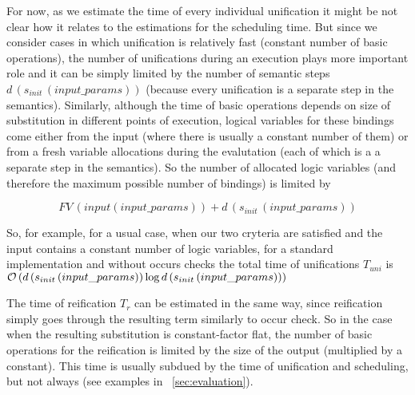 For now, as we estimate the time of every individual unification it might be not clear how it relates to the estimations for the scheduling time. But since we consider cases in which unification
is relatively fast (constant number of basic operations), the number of unifications during an execution plays more important role and it can be simply limited by the number of semantic
steps $d\,(s_{init}\,(input\_params))$ (because every unification is a separate step in the semantics). Similarly, although the time of basic operations depends on size of substitution in different points
of execution, logical variables for these bindings come either from the input (where there is usually a constant number of them) or from a fresh variable allocations during the evalutation
(each of which is a a separate step in the semantics). So the number of allocated logic variables (and therefore the maximum possible number of bindings) is limited by

\[
FV\,(input(input\_params)) + d\,(s_{init}\,(input\_params))
\]

So, for example, for a usual case, when our two cryteria are satisfied and the input contains a constant number of logic variables, for a standard implementation and without occurs checks
the total time of unifications $T_{uni}$ is $\mathcal{O}\,(d\,(s_{init}\,(input\_params)) \log d\,(s_{init}\,(input\_params)))$

The time of reification $T_r$ can be estimated in the same way, since reification simply goes through the resulting term similarly to occur check. So in the case when the resulting
substitution is constant-factor flat, the number of basic operations for the reification is limited by the size of the output (multiplied by a constant). This time is usually subdued by
the time of unification and scheduling, but not always (see examples in \sectionword~\ref{sec:evaluation}).


